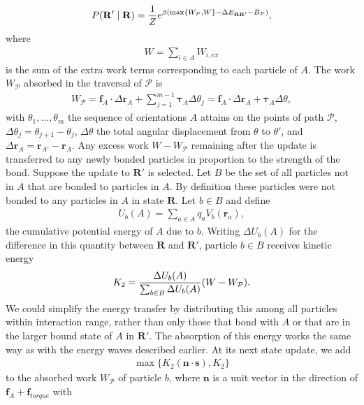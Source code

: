 \documentclass[12pt,letterpaper]{article}
\newcommand{\mb}{\mathbf}
\newcommand{\mc}{\mathcal}
\begin{document}
\begin{itemize}
\begin{align*}
P(\mb{R}' \mid \mb{R}) =
{1 \over Z}e^{\beta(\max\{W_{\mc{P}}, W\} - \Delta E_{\mb{R}\mb{R}'} - B_{\mc{P}})},
\end{align*}
where
\begin{align*}
W = \sum_{i \in A}W_{i, ex}
\end{align*}
is the sum of the extra work terms corresponding to each particle of $A$. The work $W_{\mc{P}}$ absorbed in the traversal of $\mc{P}$ is
\begin{align*}
W_{\mc{P}} = \mb{f}_{A} \cdot \Delta \mb{r}_{A} + \sum_{j=1}^{m-1}\boldsymbol{\tau}_{A}\Delta \theta_{j} = \mb{f}_{A} \cdot \Delta \mb{r}_{A} + \boldsymbol{\tau}_{A}\Delta \theta,
\end{align*}
with $\theta_{1}, \ldots, \theta_{m}$ the sequence of orientations $A$ attains on the points of path $\mc{P}$, $\Delta \theta_{j} = \theta_{j+1} - \theta_{j}$, $\Delta\theta$ the total angular displacement from $\theta$ to $\theta'$, and $\Delta\mb{r}_{A} = \mb{r}_{A'} - \mb{r}_{A}$. Any excess work $W - W_{\mc{P}}$ remaining after the update is transferred to any newly bonded particles in proportion to the strength of the bond. Suppose the update to $\mb{R}'$ is selected. Let $B$ be the set of all particles not in $A$ that are bonded to particles in $A$. By definition these particles were not bonded to any particles in $A$ in state $\mb{R}$. Let $b \in B$ and define
\begin{align*}
U_{b}(A) = \sum_{a \in A}q_{a}V_{b}(\mb{r}_{a}),
\end{align*}
the cumulative potential energy of $A$ due to $b$. Writing $\Delta U_{b}(A)$ for the difference in this quantity between $\mb{R}$ and $\mb{R}'$, particle $b \in B$ receives kinetic energy
\begin{align*}
K_{2} = {\Delta U_{b}(A) \over \sum_{b \in B} \Delta U_{b}(A)}(W - W_{\mc{P}}).
\end{align*}
We could simplify the energy transfer by distributing this among all particles within interaction range, rather than only those that bond with $A$ or that are in the larger bound state of $A$ in $\mb{R}'$. The absorption of this energy works the same way as with the energy waves described earlier. At its next state update, we add
\begin{align*}
\max\{K_{2}(\mb{n} \cdot \mb{s}), K_{2}\}
\end{align*}
to the absorbed work $W_{\mc{P}}$ of particle $b$, where $\mb{n}$ is a unit vector in the direction of $\mb{f}_{A} + \mb{f}_{torque}$ with
\begin{align*}

\end{align*}
\end{itemize}
\end{document}
